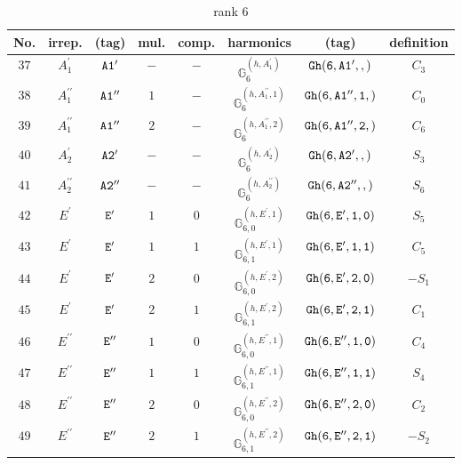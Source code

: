 \documentclass[fleqn,8pt]{jsarticle}
\begin{document}
\begin{table}[ht!]
\begin{center}
\caption{rank 6}
\renewcommand{\arraystretch}{1.3}
\begin{tabular}{cccccccc} \hline \hline
No. & irrep. & (tag) & mul. & comp. & harmonics & (tag) & definition \\ \hline
$ 37 $ & $ A_{1}^{\prime} $ & $ {\tt A1'} $ & $ - $ & $ - $ & $ \mathbb{G}_{6}^{(h,A_{1}^{\prime})} $ & $ {\tt Gh(6,A1',,)} $ & $ C_{3} $ \\
$ 38 $ & $ A_{1}^{\prime\prime} $ & $ {\tt A1''} $ & $ 1 $ & $ - $ & $ \mathbb{G}_{6}^{(h,A_{1}^{\prime\prime},1)} $ & $ {\tt Gh(6,A1'',1,)} $ & $ C_{0} $ \\
$ 39 $ & $ A_{1}^{\prime\prime} $ & $ {\tt A1''} $ & $ 2 $ & $ - $ & $ \mathbb{G}_{6}^{(h,A_{1}^{\prime\prime},2)} $ & $ {\tt Gh(6,A1'',2,)} $ & $ C_{6} $ \\
$ 40 $ & $ A_{2}^{\prime} $ & $ {\tt A2'} $ & $ - $ & $ - $ & $ \mathbb{G}_{6}^{(h,A_{2}^{\prime})} $ & $ {\tt Gh(6,A2',,)} $ & $ S_{3} $ \\
$ 41 $ & $ A_{2}^{\prime\prime} $ & $ {\tt A2''} $ & $ - $ & $ - $ & $ \mathbb{G}_{6}^{(h,A_{2}^{\prime\prime})} $ & $ {\tt Gh(6,A2'',,)} $ & $ S_{6} $ \\
$ 42 $ & $ E^{\prime} $ & $ {\tt E'} $ & $ 1 $ & $ 0 $ & $ \mathbb{G}_{6,0}^{(h,E^{\prime},1)} $ & $ {\tt Gh(6,E',1,0)} $ & $ S_{5} $ \\
$ 43 $ & $ E^{\prime} $ & $ {\tt E'} $ & $ 1 $ & $ 1 $ & $ \mathbb{G}_{6,1}^{(h,E^{\prime},1)} $ & $ {\tt Gh(6,E',1,1)} $ & $ C_{5} $ \\
$ 44 $ & $ E^{\prime} $ & $ {\tt E'} $ & $ 2 $ & $ 0 $ & $ \mathbb{G}_{6,0}^{(h,E^{\prime},2)} $ & $ {\tt Gh(6,E',2,0)} $ & $ - S_{1} $ \\
$ 45 $ & $ E^{\prime} $ & $ {\tt E'} $ & $ 2 $ & $ 1 $ & $ \mathbb{G}_{6,1}^{(h,E^{\prime},2)} $ & $ {\tt Gh(6,E',2,1)} $ & $ C_{1} $ \\
$ 46 $ & $ E^{\prime\prime} $ & $ {\tt E''} $ & $ 1 $ & $ 0 $ & $ \mathbb{G}_{6,0}^{(h,E^{\prime\prime},1)} $ & $ {\tt Gh(6,E'',1,0)} $ & $ C_{4} $ \\
$ 47 $ & $ E^{\prime\prime} $ & $ {\tt E''} $ & $ 1 $ & $ 1 $ & $ \mathbb{G}_{6,1}^{(h,E^{\prime\prime},1)} $ & $ {\tt Gh(6,E'',1,1)} $ & $ S_{4} $ \\
$ 48 $ & $ E^{\prime\prime} $ & $ {\tt E''} $ & $ 2 $ & $ 0 $ & $ \mathbb{G}_{6,0}^{(h,E^{\prime\prime},2)} $ & $ {\tt Gh(6,E'',2,0)} $ & $ C_{2} $ \\
$ 49 $ & $ E^{\prime\prime} $ & $ {\tt E''} $ & $ 2 $ & $ 1 $ & $ \mathbb{G}_{6,1}^{(h,E^{\prime\prime},2)} $ & $ {\tt Gh(6,E'',2,1)} $ & $ - S_{2} $ \\
 \hline \hline
\end{tabular}
\end{center}
\end{table}
\end{document}
